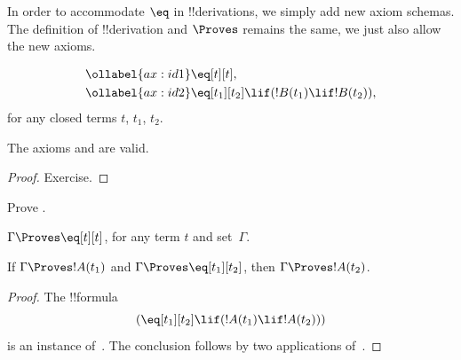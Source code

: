 \documentclass[../../../include/open-logic-section]{subfiles}
\begin{document}


In order to accommodate $\eq$ in !!{derivation}s, we simply add new
axiom schemas. The definition of !!{derivation} and $\Proves$ remains
the same, we just also allow the new axioms.

\begin{defn}
\begin{align}
\ollabel{ax:id1} & \eq[t][t], \\
\ollabel{ax:id2} & \eq[t_1][t_2] \lif (!B(t_1) \lif
  !B(t_2)),
\end{align}
for any closed terms $t$, $t_1$, $t_2$.
\end{defn}

\begin{prop}
  The axioms  and  are valid.
\end{prop}

\begin{proof}
  Exercise.
\end{proof}

\begin{prob}
Prove .
\end{prob}

\begin{prop}
 $\Gamma \Proves \eq[t][t]$, for any term $t$ and set~$\Gamma$.
\end{prop}

\begin{prop}
  If $\Gamma \Proves !A(t_1)$ and $\Gamma \Proves
  \eq[t_1][t_2]$, then $\Gamma \Proves !A(t_2)$.
\end{prop}

\begin{proof}
The !!{formula}
\[
(\eq[t_1][t_2] \lif (!A(t_1) \lif !A(t_2)))
\]
is an instance of~. The conclusion follows by two applications
of~\MP.
\end{proof}
\end{document}
